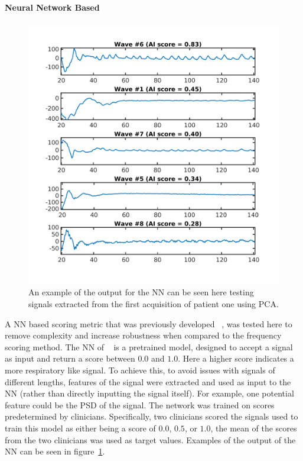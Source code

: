             \paragraph{Neural Network Based} \label{sec:neural_network_based}
                \begin{figure}
                    \centering
                    
                    \includegraphics[width=1.0\linewidth]{neural_network_output.png}
                    
                    \captionsetup{singlelinecheck=false}
                    \caption{An example of the output for the \gls{NN} can be seen here testing signals extracted from the first acquisition of patient one using \gls{PCA}.}
                    \label{fig:neural_network_output}
                \end{figure}
                
                A \gls{NN} based scoring metric that was previously developed ~\parencite{Walker2020AutomaticAI}, was tested here to remove complexity and increase robustness when compared to the frequency scoring method. The \gls{NN} of ~\parencite{Walker2020AutomaticAI} is a pretrained model, designed to accept a signal as input and return a score between $0.0$ and $1.0$. Here a higher score indicates a more respiratory like signal. To achieve this, to avoid issues with signals of different lengths, features of the signal were extracted and used as input to the \gls{NN} (rather than directly inputting the signal itself). For example, one potential feature could be the \gls{PSD} of the signal. The network was trained on scores predetermined by clinicians. Specifically, two clinicians scored the signals used to train this model as either being a score of $0.0$, $0.5$, or $1.0$, the mean of the scores from the two clinicians was used as target values. Examples of the output of the \gls{NN} can be seen in figure~\ref{fig:neural_network_output}.
            
